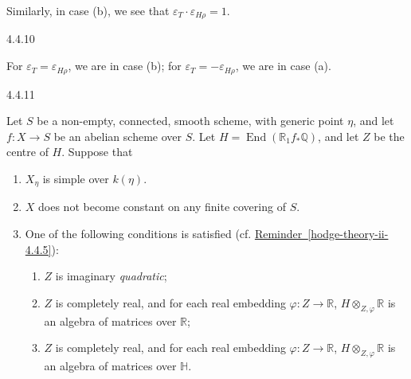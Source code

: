     Similarly, in case (b), we see that \(\varepsilon _T\cdot \varepsilon _{H\rho }=1\).\begin{lemma}{4.4.10}\label{hodge-theory-ii-4.4.10}\skipsinglepar\par{}For \(\varepsilon _T=\varepsilon _{H\rho }\), we are in case (b);
    for \(\varepsilon _T=-\varepsilon _{H\rho }\), we are in case (a).\end{lemma}\begin{proposition}{4.4.11}\label{hodge-theory-ii-4.4.11}\skipsinglepar\par{}Let \(S\) be a non-empty, connected, smooth scheme, with generic point \(\eta \), and let \(f\colon  X\to  S\) be an abelian scheme over \(S\).
    Let \(H=\operatorname {End}(\mathbb {R}_1f_*\mathbb {Q})\), and let \(Z\) be the centre of \(H\).
    Suppose that

    
 \begin{enumerate}
      
 \item[(a)]
        \(X_\eta \) is simple over \(k(\eta )\).
      


      
 \item[(b)]
        \(X\) does not become constant on any finite covering of \(S\).
      


      
 \item[(c)]
        One of the following conditions is satisfied (cf. \hyperref[hodge-theory-ii-4.4.5]{Reminder~\ref*{hodge-theory-ii-4.4.5}}):

        
 \begin{enumerate}
          
 \item[(1)]
            \(Z\) is imaginary \emph{quadratic};
          

          
 \item[(2)]
            \(Z\) is completely real, and for each real embedding \(\varphi \colon  Z\to \mathbb {R}\), \(H\otimes _{Z,\varphi }\mathbb {R}\) is an algebra of matrices over \(\mathbb {R}\);
          

          
 \item[(3)]
            \(Z\) is completely real, and for each real embedding \(\varphi \colon  Z\to \mathbb {R}\), \(H\otimes _{Z,\varphi }\mathbb {R}\) is an algebra of matrices over \(\mathbb {H}\).
          


\end{enumerate}
\end{enumerate}
\end{proposition}
